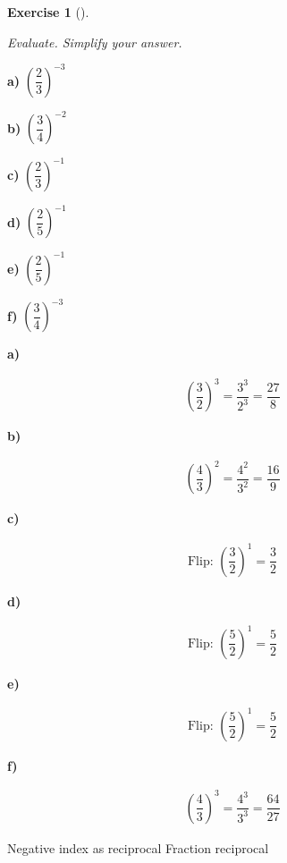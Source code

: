 \documentclass[
  letterpaper,
  DIV=11,
  numbers=noendperiod]{scrreprt}
\theoremstyle{definition}
\newtheorem{exercise}{Exercise}[chapter]
\theoremstyle{remark}
\begin{document}
\begin{exercise}[]\protect\hypertarget{exr-u2-14}{}\label{exr-u2-14}

\emph{Evaluate. Simplify your answer.}

\textbf{a)} \(\displaystyle \left(\dfrac{2}{3}\right)^{-3}\)

\textbf{b)} \(\displaystyle \left(\dfrac{3}{4}\right)^{-2}\)

\textbf{c)} \(\displaystyle \left(\dfrac{2}{3}\right)^{-1}\)

\textbf{d)} \(\displaystyle \left(\dfrac{2}{5}\right)^{-1}\)

\textbf{e)} \(\displaystyle \left(\dfrac{2}{5}\right)^{-1}\)

\textbf{f)} \(\displaystyle \left(\dfrac{3}{4}\right)^{-3}\)

\begin{tcolorbox}[enhanced jigsaw, opacitybacktitle=0.6, coltitle=black, arc=.35mm, colframe=quarto-callout-tip-color-frame, colback=white, bottomrule=.15mm, left=2mm, colbacktitle=quarto-callout-tip-color!10!white, titlerule=0mm, opacityback=0, title=\textcolor{quarto-callout-tip-color}{\faLightbulb}\hspace{0.5em}{🔍 View Solutions}, leftrule=.75mm, breakable, rightrule=.15mm, bottomtitle=1mm, toptitle=1mm, toprule=.15mm]

\textbf{a)}

\[
\begin{aligned}
\left(\dfrac{3}{2}\right)^{3}=\dfrac{3^{3}}{2^{3}}=\dfrac{27}{8}
\end{aligned}
\]

\textbf{b)}

\[
\begin{aligned}
\left(\dfrac{4}{3}\right)^{2}=\dfrac{4^{2}}{3^{2}}=\dfrac{16}{9}
\end{aligned}
\]

\textbf{c)}

\[
\begin{aligned}
\text{Flip: }\left(\dfrac{3}{2}\right)^{1}=\dfrac{3}{2}
\end{aligned}
\]

\textbf{d)}

\[
\begin{aligned}
\text{Flip: }\left(\dfrac{5}{2}\right)^{1}=\dfrac{5}{2}
\end{aligned}
\]

\textbf{e)}

\[
\begin{aligned}
\text{Flip: }\left(\dfrac{5}{2}\right)^{1}=\dfrac{5}{2}
\end{aligned}
\]

\textbf{f)}

\[
\begin{aligned}
\left(\dfrac{4}{3}\right)^{3}=\dfrac{4^{3}}{3^{3}}=\dfrac{64}{27}
\end{aligned}
\]

\end{tcolorbox}

{Negative index as reciprocal} {Fraction reciprocal}

\end{exercise}
\end{document}
